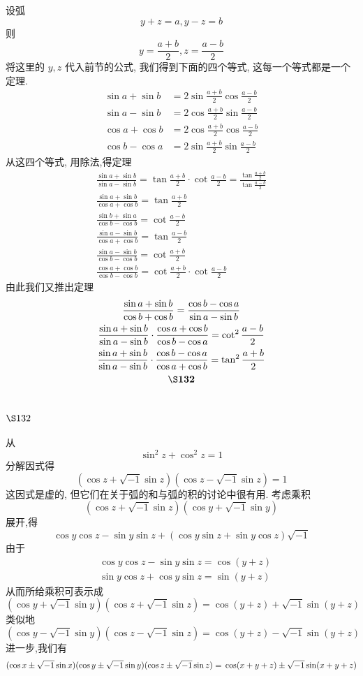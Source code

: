 设弧
\[
y+z=a, y-z=b
\]
则
\[
y=\frac{a+b}{2}, z=\frac{a-b}{2}
\]
将这里的 $y, z$ 代入前节的公式, 我们得到下面的四个等式, 这每一个等式都是一个定理.
\[
\begin{aligned}
\sin a+\sin b & =2 \sin \frac{a+b}{2} \cos \frac{a-b}{2} \\
\sin a-\sin b & =2 \cos \frac{a+b}{2} \sin \frac{a-b}{2} \\
\cos a+\cos b & =2 \cos \frac{a+b}{2} \cos \frac{a-b}{2} \\
\cos b-\cos a & =2 \sin \frac{a+b}{2} \sin \frac{a-b}{2}
\end{aligned}
\]
从这四个等式, 用除法,得定理
\[
\begin{gathered}
\frac{\sin a+\sin b}{\sin a-\sin b}=\tan \frac{a+b}{2} \cdot \cot \frac{a-b}{2}=\frac{\tan \frac{a+b}{2}}{\tan \frac{a-b}{2}} \\
\frac{\sin a+\sin b}{\cos a+\cos b}=\tan \frac{a+b}{2} \\
\frac{\sin b+\sin a}{\cos b-\cos b}=\cot \frac{a-b}{2} \\
\frac{\sin a-\sin b}{\cos a+\cos b}=\tan \frac{a-b}{2} \\
\frac{\sin a-\sin b}{\cos b-\cos b}=\cot \frac{a+b}{2} \\
\frac{\cos a+\cos b}{\cos b-\cos b}=\cot \frac{a+b}{2} \cdot \cot \frac{a-b}{2}
\end{gathered}
\]
由此我们又推出定理
\[
\begin{gathered}
\frac{\sin a+\sin b}{\cos b+\cos b}=\frac{\cos b-\cos a}{\sin a-\sin b} \\
\frac{\sin a+\sin b}{\sin a-\sin b} \cdot \frac{\cos a+\cos b}{\cos b-\cos a}=\cot ^{2} \frac{a-b}{2} \\
\frac{\sin a+\sin b}{\sin a-\sin b} \cdot \frac{\cos b-\cos a}{\cos a+\cos b}=\tan ^{2} \frac{a+b}{2} \\
\S \mathbf{1 3 2}
\end{gathered}
\]
\section{$\S 132$}
从
\[
\sin ^{2} z+\cos ^{2} z=1
\]
分解因式得
\[
(\cos z+\sqrt{-1} \sin z)(\cos z-\sqrt{-1} \sin z)=1
\]
这因式是虚的, 但它们在关于弧的和与弧的积的讨论中很有用. 考虑乘积
\[
(\cos z+\sqrt{-1} \sin z)(\cos y+\sqrt{-1} \sin y)
\]
展开,得
\[
\cos y \cos z-\sin y \sin z+(\cos y \sin z+\sin y \cos z) \sqrt{-1}
\]
由于
\[
\begin{aligned}
& \cos y \cos z-\sin y \sin z=\cos (y+z) \\
& \sin y \cos z+\cos y \sin z=\sin (y+z)
\end{aligned}
\]
从而所给乘积可表示成
\[
(\cos y+\sqrt{-1} \sin y)(\cos z+\sqrt{-1} \sin z)=\cos (y+z)+\sqrt{-1} \sin (y+z)
\]
类似地
\[
(\cos y-\sqrt{-1} \sin y)(\cos z-\sqrt{-1} \sin z)=\cos (y+z)-\sqrt{-1} \sin (y+z)
\]
进一步,我们有
\[
(\cos x \pm \sqrt{-1} \sin x)(\cos y \pm \sqrt{-1} \sin y)(\cos z \pm \sqrt{-1} \sin z)= \\
\cos (x+y+z) \pm \sqrt{-1} \sin (x+y+z) 
\]
